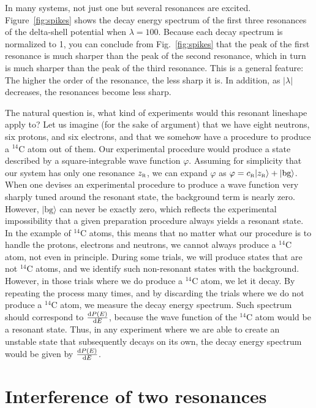 \documentclass[12pt]{article}
\newcommand{\rmd}{{\rm d}}
\newcommand{\zr}{z_{\text{\tiny R}}}
\newcommand{\Cr}{c_{\text{\tiny R}}}
\begin{document}
In many systems, not just one but several resonances are 
excited. Figure~\ref{fig:spikes} shows the decay energy spectrum of the
first three resonances of the delta-shell potential when 
$\lambda =100$. Because each decay spectrum is normalized to 1, you can
conclude from Fig.~\ref{fig:spikes} that the peak of the
first resonance is much sharper than the peak of the second resonance,
which in turn is much sharper than the peak of the third resonance. This
is a general feature: The higher the order of the resonance, the less 
sharp it is. In addition, as $|\lambda|$ decreases, the resonances become
less sharp.

The natural question is, what kind of experiments would this resonant
lineshape apply to? Let us imagine (for the sake of argument) that we 
have eight neutrons, six protons, and six electrons, and that we somehow have 
a procedure to produce a $^{14}$C atom out of them. Our experimental 
procedure would produce a state described by a square-integrable wave 
function $\varphi$. Assuming for simplicity that our system has
only one resonance $\zr$, we can expand $\varphi$ as
$\varphi = \Cr |\zr \rangle + |\text{bg}\rangle$. When one 
devises an experimental procedure to produce a
wave function very sharply tuned around the resonant state, the background
term is nearly zero. However, $|\text{bg}\rangle$ can never be
exactly zero, which reflects the experimental impossibility that a given
preparation procedure always yields a resonant state. In the example 
of $^{14}$C atoms, this means that no matter what our procedure is to
handle the protons, electrons and neutrons, we cannot always produce 
a $^{14}$C atom, not even in principle. During some trials, we will produce 
states that are not $^{14}$C atoms, and we identify such non-resonant
states with the background. However, in those trials where we do 
produce a $^{14}$C atom, we let it decay. By
repeating the process many times, and by discarding the trials where
we do not produce a $^{14}$C atom,  we measure
the decay energy spectrum. Such spectrum should correspond to
$\frac{\rmd P (E)}{\rmd E}$, because the wave function of the $^{14}$C atom
would be a resonant state. Thus, in any experiment where we are able
to create an unstable state that subsequently decays on its own, the
decay energy spectrum would be given by $\frac{\rmd P (E)}{\rmd E}$. 


          
      


\section{Interference of two resonances}
\setcounter{equation}{0}
\label{sec:interference}                 
        
\end{document}
